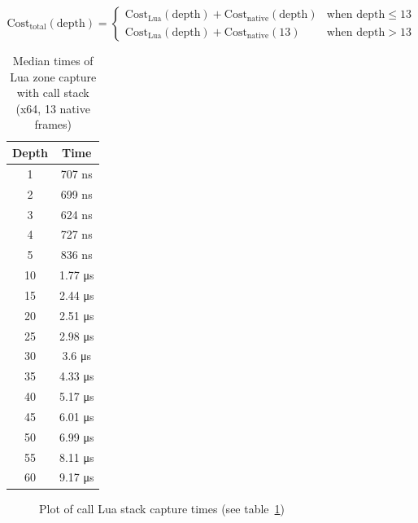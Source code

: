 \documentclass[hidelinks,titlepage,a4paper]{article}
\begin{document}
\begin{displaymath}
\text{Cost}_{\text{total}}(\text{depth}) =
\begin{cases}
\text{Cost}_{\text{Lua}}(\text{depth}) + \text{Cost}_{\text{native}}(\text{depth}) & \text{when depth} \leq 13 \\
\text{Cost}_{\text{Lua}}(\text{depth}) + \text{Cost}_{\text{native}}(13) & \text{when depth} > 13
\end{cases}
\end{displaymath}

\begin{table}[h]
\centering
\begin{tabular}[h]{c|c}
\textbf{Depth} & \textbf{Time} \\ \hline
1 & 707 \si{\nano\second} \\
2 & 699 \si{\nano\second} \\
3 & 624 \si{\nano\second} \\
4 & 727 \si{\nano\second} \\
5 & 836 \si{\nano\second} \\
10 & 1.77 \si{\micro\second} \\
15 & 2.44 \si{\micro\second} \\
20 & 2.51 \si{\micro\second} \\
25 & 2.98 \si{\micro\second} \\
30 & 3.6 \si{\micro\second} \\
35 & 4.33 \si{\micro\second} \\
40 & 5.17 \si{\micro\second} \\
45 & 6.01 \si{\micro\second} \\
50 & 6.99 \si{\micro\second} \\
55 & 8.11 \si{\micro\second} \\
60 & 9.17 \si{\micro\second}
\end{tabular}
\caption{Median times of Lua zone capture with call stack (x64, 13 native frames)}
\label{CallstackTimesLua}
\end{table}

\begin{figure}[h]
\centering{}
\caption{Plot of call Lua stack capture times (see table~\ref{CallstackTimesLua})}
\label{CallstackPlotLua}
\end{figure}
\end{document}
